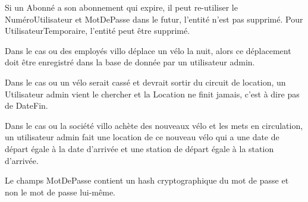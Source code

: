 \documentclass[a4paper,10pt]{article}
\begin{document}
Si un Abonné a son abonnement qui expire, il peut re-utiliser le NuméroUtilisateur et MotDePasse dans le futur, l'entité n'est pas supprimé. Pour UtilisateurTemporaire, l'entité peut être supprimé.

Dans le cas ou des employés villo déplace un vélo la nuit, alors ce déplacement doit être enregistré dans la base de donnée par un utilisateur admin.

Dans le cas ou un vélo serait cassé et devrait sortir du circuit de location, un Utilisateur admin vient le chercher et la Location ne finit jamais, c'est à dire pas de DateFin.

Dans le cas ou la société villo achète des nouveaux vélo et les mets en circulation, un utilisateur admin fait une location de ce nouveau vélo qui a une date de départ égale à la date d'arrivée et une station de départ égale à la station d'arrivée.

Le champs MotDePasse contient un hash cryptographique du mot de passe et non le mot de passe lui-m\^eme.
\end{document}
